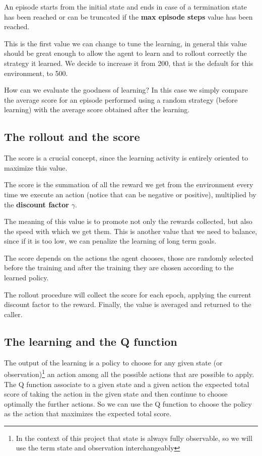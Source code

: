 \documentclass{article}
\begin{document}
An episode starts from the initial state and ends in case of a termination state has been reached or 
can be truncated if the \textbf{max episode steps} value has been reached.

This is the first value we can change to tune the learning, in general this value should be 
great enough to allow the agent to learn and to rollout correctly the strategy it learned.
We decide to increase it from 200, that is the default for this environment, to 500.

How can we evaluate the goodness of learning? In this case we simply compare the average score for an episode 
performed using a random strategy (before learning) with the average score obtained after the learning.

\subsection{The rollout and the score}

The score is a crucial concept, since the learning activity is entirely oriented to maximize this value.

The score is the summation of all the reward we get from the environment every time we execute an action 
(notice that can be negative or positive),
multiplied by the \textbf{discount factor} $\gamma$.

The meaning of this value is to promote not only the rewards collected, but also the speed with which we get them.
This is another value that we need to balance, since if it is too low, we can penalize the learning of long term goals.

The score depends on the actions the agent chooses, those are randomly selected before the training 
and after the training they are chosen according to the learned policy.

The rollout procedure will collect the score for each epoch, applying the current discount factor to the reward.
Finally, the value is averaged and returned to the caller.

\subsection{The learning and the Q function}

The output of the learning is a policy to choose for any given state (or observation)\footnote[2]{
In the context of this project that state is always fully observable, so we will use the term state 
and observation interchangeably} an action among all the possible actions that are possible to apply.
The Q function associate to a given state and a given action the expected total score of taking the action 
in the given state and then continue to choose optimally the further actions.
So we can use the Q function to choose the policy as the action that maximizes the expected total score.
\end{document}
